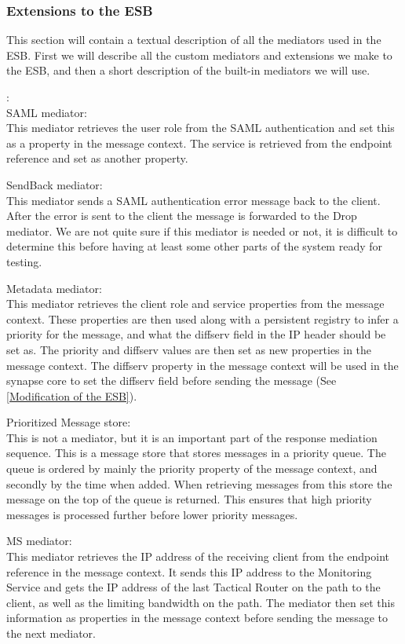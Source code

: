     \subsubsection{Extensions to the ESB}\label{Extensions to the ESB} 
    This section will contain a textual description of all the mediators used in the ESB. First we will describe all the custom mediators and extensions we make to the ESB, and then a short description of the built-in mediators we will use.

    \label{Custom mediators}:
    \\
    SAML mediator:\\
    This mediator retrieves the user role from the SAML authentication and set this as a property in the message context. The service is retrieved from the endpoint reference and set as another property.

    SendBack mediator:\\
    This mediator sends a SAML authentication error message back to the client. After the error is sent to the client the message is forwarded to the Drop mediator. We are not quite sure if this mediator is needed or not, it is difficult to determine this before having at least some other parts of the system ready for testing.

    Metadata mediator:\\
    This mediator retrieves the client role and service properties from the message context. These properties are then used along with a persistent registry to infer a priority for the message, and what the diffserv field in the IP header should be set as. The priority and diffserv values are then set as new properties in the message context.
    The diffserv property in the message context will be used in the synapse core to set the diffserv field before sending the message (See \ref{Modification of the ESB}).

    Prioritized Message store:\\
    This is not a mediator, but it is an important part of the response mediation sequence. This is a message store that stores messages in a priority queue. The queue is ordered by mainly the priority property of the message context, and secondly by the time when added. When retrieving messages from this store the message on the top of the queue is returned. This ensures that high priority messages is processed further before lower priority messages.

    MS mediator:\\
    This mediator retrieves the IP address of the receiving client from the endpoint reference in the message context. It sends this IP address to the Monitoring Service and gets the IP address of the last Tactical Router on the path to the client, as well as the limiting bandwidth on the path. The mediator then set this information as properties in the message context before sending the message to the next mediator.

